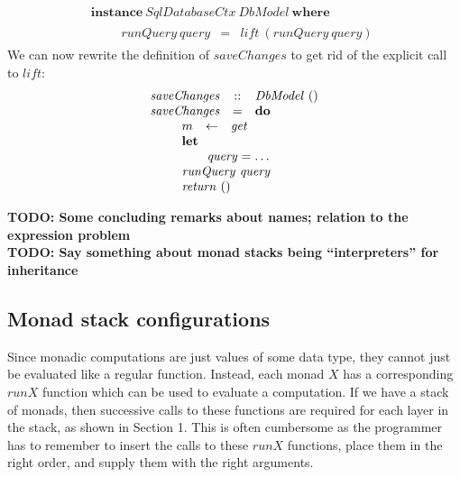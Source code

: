 \begin{displaymath}
\begin{array}{l}
\mathbf{instance}~\mathit{SqlDatabaseCtx}~\mathit{DbModel}~\mathbf{where}\\
\qquad \begin{array}{lcl}
\mathit{runQuery}~\mathit{query} & = & \mathit{lift}~(\mathit{runQuery}~\mathit{query})
\end{array}
\end{array}
\end{displaymath}
We can now rewrite the definition of $\mathit{saveChanges}$ to get rid of the explicit call to $\mathit{lift}$:
\begin{displaymath}
\begin{array}{lcl}
\mathit{saveChanges} & :: & \mathit{DbModel}~() \\
\mathit{saveChanges} & = & \mathbf{do} \\
\multicolumn{3}{l}{\qquad \begin{array}{lcl}
    m & \leftarrow & \mathit{get} \\
    \multicolumn{3}{l}{\mathbf{let}} \\
    \multicolumn{3}{l}{\qquad \mathit{query} = \ldots} \\
    \multicolumn{3}{l}{\mathit{runQuery}~\mathit{query}}\\
    \multicolumn{3}{l}{\mathit{return}~()}
\end{array} }
\end{array}
\end{displaymath}

\textbf{TODO: Some concluding remarks about names; relation to the expression problem}\\
\textbf{TODO: Say something about monad stacks being ``interpreters'' for inheritance}

\subsection{Monad stack configurations}

Since monadic computations are just values of some data type, they cannot just be evaluated like a regular function. Instead, each monad $X$ has a corresponding $\mathit{runX}$ function which can be used to evaluate a computation. If we have a stack of monads, then successive calls to these functions are required for each layer in the stack, as shown in Section 1. This is often cumbersome as the programmer has to remember to insert the calls to these $\mathit{runX}$ functions, place them in the right order, and supply them with the right arguments.

